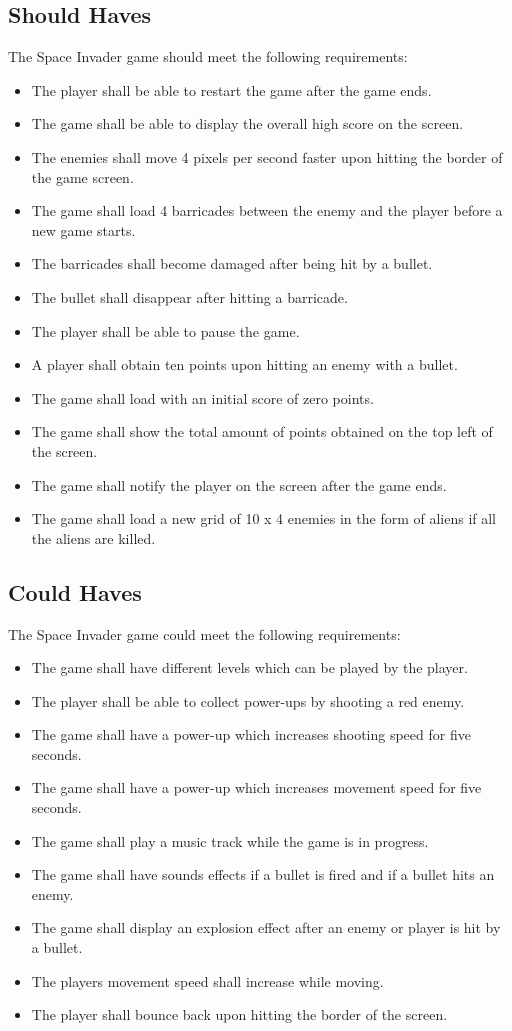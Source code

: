 \subsection{Should Haves}
The Space Invader game should meet the following requirements:
\begin{itemize}
	\item The player shall be able to restart the game after the game ends.
	\item The game shall be able to display the overall high score on the screen.
	\item The enemies shall move 4 pixels per second faster upon hitting the border of the game screen.
	\item The game shall load 4 barricades between the enemy and the player before a new game starts.
	\item The barricades shall become damaged after being hit by a bullet.
	\item The bullet shall disappear after hitting a barricade.
	\item The player shall be able to pause the game.
	\item A player shall obtain ten points upon hitting an enemy with a bullet.
	\item The game shall load with an initial score of zero points.
	\item The game shall show the total amount of points obtained on the top left of the screen.	
	\item The game shall notify the player on the screen after the game ends.	
	\item The game shall load a new grid of 10 x 4 enemies in the form of aliens if all the aliens are killed.
\end{itemize}

\subsection{Could Haves}
The Space Invader game could meet the following requirements:
\begin{itemize}
	\item The game shall have different levels which can be played by the player.
	\item The player shall be able to collect power-ups by shooting a red enemy.
	\item The game shall have a power-up which increases shooting speed for five seconds.
	\item The game shall have a power-up which increases movement speed for five seconds.
	\item The game shall play a music track while the game is in progress.
	\item The game shall have sounds effects if a bullet is fired and if a bullet hits an enemy.
	\item The game shall display an explosion effect after an enemy or player is hit by a bullet.
	\item The players movement speed shall increase while moving.
	\item The player shall bounce back upon hitting the border of the screen.
\end{itemize}

